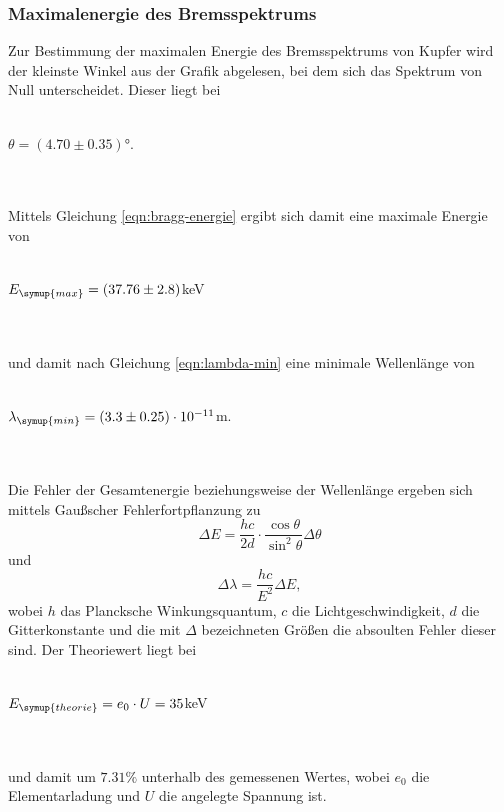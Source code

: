     \subsubsection{Maximalenergie des Bremsspektrums}
        Zur Bestimmung der maximalen Energie des Bremsspektrums von Kupfer wird der kleinste Winkel aus der Grafik abgelesen, bei dem sich 
        das Spektrum von Null unterscheidet. Dieser liegt bei 
        \\ \\
        \centerline{$\theta = (4.70  \pm 0.35)° $.}
        \\ \\
        Mittels Gleichung \eqref{eqn:bragg-energie} ergibt sich damit eine maximale Energie von
        \\ \\
        \centerline{$E_{\symup{max}} = (37.76 \pm 2.8)$keV}
        \\ \\ 
        und damit nach Gleichung \eqref{eqn:lambda-min} eine minimale Wellenlänge von
        \\ \\
        \centerline{$\lambda_{\symup{min}} = (3.3 \pm 0.25) \cdot 10^{-11}$m.}
        \\ \\
        Die Fehler der Gesamtenergie beziehungsweise der Wellenlänge ergeben sich mittels Gaußscher Fehlerfortpflanzung zu 
        \begin{equation}
        \label{eqn:fehlerE}
            \Delta E = \frac{h c}{2 d} \cdot \frac{\cos{\theta}}{\sin^2{\theta}} \Delta \theta
        \end{equation}
        und 
        \begin{equation}
        \label{eqn:fehlerL}
            \Delta \lambda = \frac{h c}{E^2} \Delta E,
        \end{equation}
        wobei $h$ das Plancksche Winkungsquantum, $c$ die Lichtgeschwindigkeit, $d$ die Gitterkonstante und die mit $\Delta$ bezeichneten
        Größen die absoulten Fehler dieser sind. 
        Der Theoriewert liegt  bei 
        \\ \\
        \centerline{$E_{\symup{theorie}} = e_0 \cdot U = 35$keV}
        \\ \\
        und damit um $7.31 \%$ unterhalb des gemessenen Wertes, wobei $e_0$ die Elementarladung und $U$ die angelegte Spannung ist.

